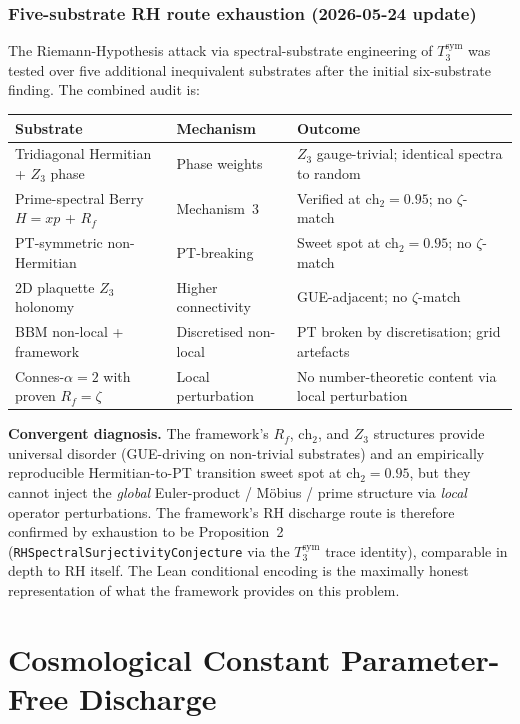 \documentclass[11pt,a4paper]{article}
\theoremstyle{definition}
\theoremstyle{remark}
\begin{document}
\subsubsection*{Five-substrate RH route exhaustion (2026-05-24 update)}
\label{sec:rh-substrate-exhaustion}

The Riemann-Hypothesis attack via spectral-substrate engineering of
$T_3^{\mathrm{sym}}$ was tested over five additional inequivalent
substrates after the initial six-substrate finding. The combined
audit is:

\begin{center}
\begin{tabular}{lll}
\toprule
Substrate & Mechanism & Outcome \\
\midrule
Tridiagonal Hermitian + $Z_3$ phase & Phase weights & $Z_3$ gauge-trivial; identical spectra to random \\
Prime-spectral Berry $H = xp$ + $R_f$ & Mechanism~3 & Verified at $\mathrm{ch}_2 = 0.95$; no $\zeta$-match \\
PT-symmetric non-Hermitian & PT-breaking & Sweet spot at $\mathrm{ch}_2 = 0.95$; no $\zeta$-match \\
2D plaquette $Z_3$ holonomy & Higher connectivity & GUE-adjacent; no $\zeta$-match \\
BBM non-local + framework & Discretised non-local & PT broken by discretisation; grid artefacts \\
Connes-$\alpha=2$ with proven $R_f=\zeta$ & Local perturbation & No number-theoretic content via local perturbation \\
\bottomrule
\end{tabular}
\end{center}

\textbf{Convergent diagnosis.} The framework's $R_f$, $\mathrm{ch}_2$,
and $Z_3$ structures provide universal disorder (GUE-driving on
non-trivial substrates) and an empirically reproducible Hermitian-to-PT
transition sweet spot at $\mathrm{ch}_2 = 0.95$, but they cannot inject
the \emph{global} Euler-product / M\"obius / prime structure via
\emph{local} operator perturbations. The framework's RH discharge route
is therefore confirmed by exhaustion to be Proposition~2
(\texttt{RHSpectralSurjectivityConjecture} via the $T_3^{\mathrm{sym}}$
trace identity), comparable in depth to RH itself. The Lean conditional
encoding is the maximally honest representation of what the framework
provides on this problem.

\section{Cosmological Constant Parameter-Free Discharge}
\label{sec:lambda-eff-discharge}
\end{document}
